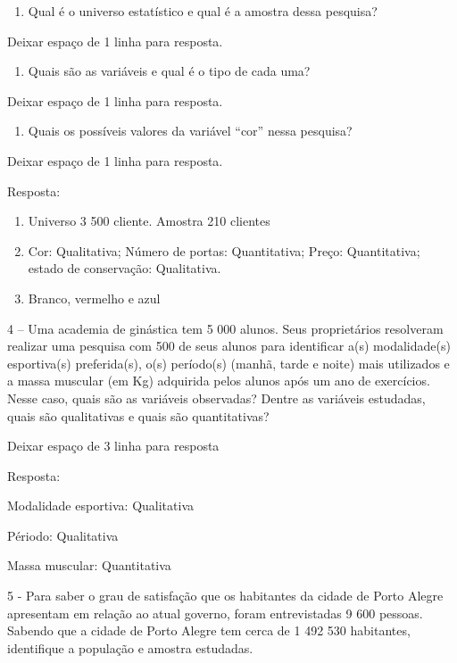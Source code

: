 \begin{enumerate}
\def\labelenumi{\alph{enumi})}
\item
  Qual é o universo estatístico e qual é a amostra dessa pesquisa?
\end{enumerate}

Deixar espaço de 1 linha para resposta.

\begin{enumerate}
\def\labelenumi{\alph{enumi})}
\item
  Quais são as variáveis e qual é o tipo de cada uma?
\end{enumerate}

Deixar espaço de 1 linha para resposta.

\begin{enumerate}
\def\labelenumi{\alph{enumi})}
\item
  Quais os possíveis valores da variável ``cor'' nessa pesquisa?
\end{enumerate}

Deixar espaço de 1 linha para resposta.

Resposta:

\begin{enumerate}
\def\labelenumi{\alph{enumi})}
\item
  Universo 3 500 cliente. Amostra 210 clientes
\item
  Cor: Qualitativa; Número de portas: Quantitativa; Preço: Quantitativa;
  estado de conservação: Qualitativa.
\item
  Branco, vermelho e azul
\end{enumerate}

4 -- Uma academia de ginástica tem 5 000 alunos. Seus proprietários
resolveram realizar uma pesquisa com 500 de seus alunos para identificar
a(s) modalidade(s) esportiva(s) preferida(s), o(s) período(s) (manhã,
tarde e noite) mais utilizados e a massa muscular (em Kg) adquirida
pelos alunos após um ano de exercícios. Nesse caso, quais são as
variáveis observadas? Dentre as variáveis estudadas, quais são
qualitativas e quais são quantitativas?

Deixar espaço de 3 linha para resposta

Resposta:

Modalidade esportiva: Qualitativa

Périodo: Qualitativa

Massa muscular: Quantitativa

5 - Para saber o grau de satisfação que os habitantes da cidade de Porto
Alegre apresentam em relação ao atual governo, foram entrevistadas 9 600
pessoas. Sabendo que a cidade de Porto Alegre tem cerca de 1 492 530
habitantes, identifique a população e amostra estudadas.

